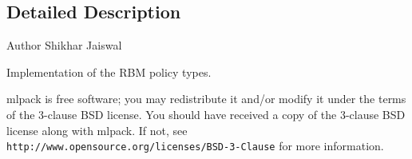 \subsection{Detailed Description}
\begin{DoxyAuthor}{Author}
Shikhar Jaiswal
\end{DoxyAuthor}
Implementation of the R\+BM policy types.

mlpack is free software; you may redistribute it and/or modify it under the terms of the 3-\/clause B\+SD license. You should have received a copy of the 3-\/clause B\+SD license along with mlpack. If not, see {\tt http\+://www.\+opensource.\+org/licenses/\+B\+S\+D-\/3-\/\+Clause} for more information. 